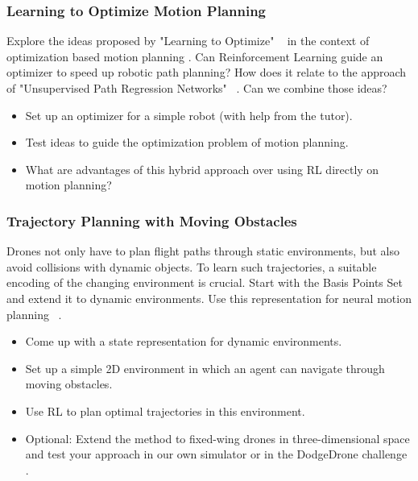 \documentclass[a4paper]{article}
\begin{document}
\subsubsection{Learning to Optimize Motion Planning}
Explore the ideas proposed by "Learning to Optimize" ~\cite{LiM16b} in the context of optimization based motion planning \cite{Zucker2013}.
Can Reinforcement Learning guide an optimizer to speed up robotic path planning?
How does it relate to the approach of "Unsupervised Path Regression Networks" ~\cite{Pandy2020}.
Can we combine those ideas?

\begin{itemize}
  \item Set up an optimizer for a simple robot (with help from the tutor).
  \item Test ideas to guide the optimization problem of motion planning.
  \item What are advantages of this hybrid approach over using RL directly on motion planning?
\end{itemize}

\subsubsection{Trajectory Planning with Moving Obstacles}
Drones not only have to plan flight paths through static environments, but also avoid collisions with dynamic objects.
To learn such trajectories, a suitable encoding of the changing environment is crucial.
Start with the Basis Points Set ~\cite{Prokudin2019} and extend it to dynamic environments.
Use this representation for neural motion planning ~\cite{Qureshi2019}.

\begin{itemize}
  \item Come up with a state representation for dynamic environments.
  \item Set up a simple 2D environment in which an agent can navigate through moving obstacles.
  \item Use RL to plan optimal trajectories in this environment. 
  \item Optional: Extend the method to fixed-wing drones in three-dimensional space and test your approach in our own simulator \cite{BionicVTOL} or in the DodgeDrone challenge \cite{DodgeDroneChallenge}.
\end{itemize}
\end{document}
